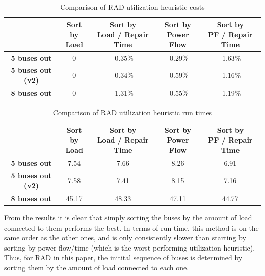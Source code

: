 \documentclass[12pt]{article}
\begin{document}
\begin{table}[ht]
    \centering
    \begin{tabular}{|c|c|c|c|c|}
        \hline
        & \makecell{Sort by \\ Load} 
        & \makecell{Sort by \\ Load / Repair Time} 
        & \makecell{Sort by \\ Power Flow} 
        & \makecell{Sort by \\ PF / Repair Time} \\
        \hline
        \textbf{5 buses out} & 0 & -0.35\% & -0.29\% & -1.63\% \\
        \hline
        \textbf{5 buses out (v2)} & 0 & -0.34\% & -0.59\% & -1.16\% \\
        \hline
        \textbf{8 buses out} & 0 & -1.31\% & -0.55\% & -1.19\% \\
        \hline
    \end{tabular}
    \caption{Comparison of RAD utilization heuristic costs}
    \label{tab:rad_results}
\end{table}

\begin{table}[ht]
    \centering
    \renewcommand{\arraystretch}{1.2} %
    \begin{tabular}{|c|c|c|c|c|}
        \hline
        & \makecell{Sort by \\ Load} 
        & \makecell{Sort by \\ Load / Repair Time} 
        & \makecell{Sort by \\ Power Flow} 
        & \makecell{Sort by \\ PF / Repair Time} \\
        \hline
        \textbf{5 buses out} & 7.54 & 7.66 & 8.26 & 6.91 \\
        \hline
        \textbf{5 buses out (v2)} & 7.58 & 7.41 & 8.15 & 7.16 \\
        \hline
        \textbf{8 buses out} & 45.17 & 48.33 & 47.11 & 44.77 \\
        \hline
    \end{tabular}
    \caption{Comparison of RAD utilization heuristic run times}
    \label{tab:rad_times}
\end{table}

From the results it is clear that simply sorting the buses by the amount of load connected to them performs the best. In terms of run time, this method is on the same order as the other ones, and is only consistently slower than starting by sorting by power flow/time (which is the worst performing utilization heuristic). Thus, for RAD in this paper, the initital sequence of buses is determined by sorting them by the amount of load connected to each one.
\end{document}
